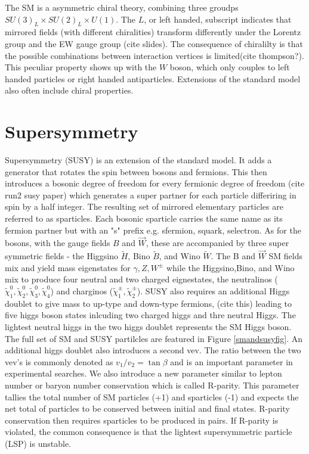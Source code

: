The SM is a asymmetric chiral theory, combining three groudps $SU(3)_L \times SU(2)_L \times U(1)$. The $L$, or left handed, subscript indicates that mirrored fields (with different chiralities)  transform differently under the Lorentz group and the EW gauge group (cite slides).  The consequence of chiralilty is that the possible combinations between interaction vertices is limited(cite thompson?). This peculiar property shows up with the $W$ boson, which only couples to left handed particles or right handed antiparticles. Extensions of the standard model also often include chiral properties.  %

\section{Supersymmetry}

Supersymmetry (SUSY) is an extension of the standard model. It adds a generator that rotates the spin between bosons and fermions. This then introduces a bosonic degree of freedom for every fermionic degree of freedom (cite run2 susy paper) which generates a super partner for each particle differiring in spin by a half integer.  The resulting set of mirrored elementary particles are referred to as sparticles. Each bosonic sparticle carries the same name as its fermion partner but with an "s" prefix e.g. sfermion, squark, selectron. As for the bosons, with the gauge fields $B$ and $\vec{W}$, these are accompanied by three super symmetric fields - the Higgsino $\tilde{H}$, Bino $\tilde{B}$, and Wino $\tilde{W}$. The B and $\vec{W}$ SM fields mix and yield mass eigenstates for $\gamma, Z, W^\pm$ while the Higgsino,Bino, and Wino mix to produce four neutral and two charged eignestates, the neutralinos ($\tilde{\chi}^0_1, \tilde{\chi}^0_2, \tilde{\chi}^0_3, \tilde{\chi}^0_4$)  and charginos ($\tilde{\chi}^\pm_1, \tilde{\chi}^\pm_2$). SUSY also requires an additional Higgs doublet to give mass to up-type and down-type fermions, (cite this) leading to five higgs boson states inlcuding two charged higgs and thre neutral Higgs. The lightest neutral higgs in the two higgs doublet represents the SM Higgs boson. The full set of SM and SUSY partilcles are featured in Figure \ref{smandsusyfig}. An additional higgs doublet also introduces a second vev. The ratio between the two vev's  is commonly denoted as $v_1/v_2 = \tan \beta$ and is an important parameter in experimental searches. We also introduce a new parameter similar to lepton number or baryon number conservation which is called R-parity. This parameter tallies the total number of SM particles (+1) and sparticles (-1) and expects the net total of particles to be conserved between initial and final states. R-parity conservation then requires sparticles to be produced in pairs. If R-parity is violated, the common consequence is that the lightest supersymmetric particle (LSP) is unstable. 

